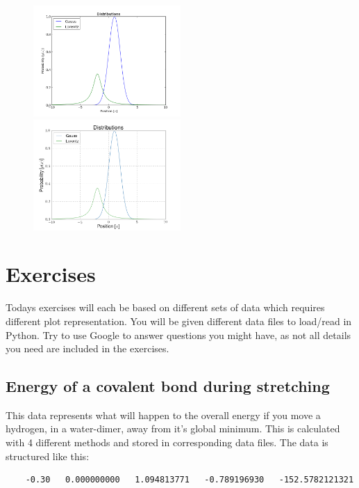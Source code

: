 \documentclass{article}
\begin{document}
\begin{figure}[htb]
  \includegraphics[width=0.5\textwidth]{images/figure_xy_before.png}
  \includegraphics[width=0.5\textwidth]{images/figure_xy_after.png}
\end{figure}




\section{Exercises}

Todays exercises will each be based on different sets of data which requires different plot representation.
You will be given different data files to load/read in Python.
Try to use Google to answer questions you might have, as not all details you need are included in the exercises.

\newpage
\subsection{Energy of a covalent bond during stretching}

This data represents what will happen to the overall energy if you move a hydrogen, in a water-dimer, away from it's global minimum.
This is calculated with 4 different methods and stored in corresponding data files.
The data is structured like this:

\begin{lstlisting}
    -0.30   0.000000000   1.094813771   -0.789196930   -152.5782121321
\end{lstlisting}
\end{document}

